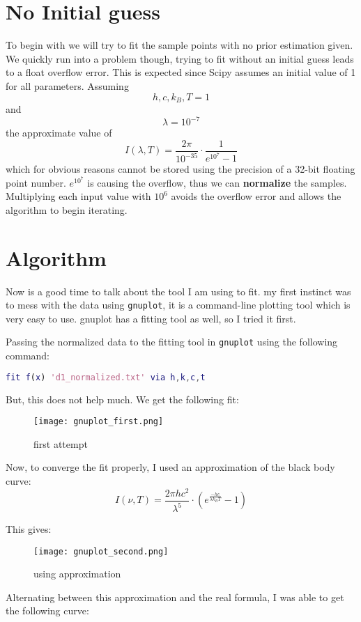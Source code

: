 \documentclass{report}
\begin{document}
\section*{No Initial guess}
To begin with we will try to fit the sample points with no prior estimation given. We quickly run into a problem though, trying to fit without an initial guess leads to a float overflow error. This is expected since Scipy assumes an initial value of 1 for all parameters. Assuming 
\[h, c, k_B, T = 1\] 
and 
\[\lambda = 10^{-7}\] 
the approximate value of \[I(\lambda, T) = \frac{2 \pi}{10^{-35}} \cdot \frac{1}{e^{10^7} - 1}\]
which for obvious reasons cannot be stored using the precision of a 32-bit floating point number. $e^{10^7}$ is causing the overflow, thus we can \textbf{normalize} the samples. Multiplying each input value with $10^6$ avoids the overflow error and allows the algorithm to begin iterating.

\section*{Algorithm}
Now is a good time to talk about the tool I am using to fit. my first instinct was to mess with the data using \texttt{gnuplot}, it is a command-line plotting tool which is very easy to use. gnuplot has a fitting tool as well, so I tried it first. 

Passing the normalized data to the fitting tool in \texttt{gnuplot} using the following command: 

\begin{lstlisting}[language=matlab]
	fit f(x) 'd1_normalized.txt' via h,k,c,t
\end{lstlisting}	

But, this does not help much. We get the following fit:
\begin{figure}[!h]
	\centering
	\texttt{[image: gnuplot\_first.png]}
    \caption{first attempt}
\end{figure}

Now, to converge the fit properly, I used an approximation of the 
black body curve: \[I(\nu, T) = \frac{2 \pi h c^2}{\lambda^5} \cdot ({e^{\frac{-h c}{\lambda k_B T}} - 1})\]

This gives: 
\begin{figure}[!h]
	\centering
	\texttt{[image: gnuplot\_second.png]}
    \caption{using approximation}
\end{figure}
\FloatBarrier
Alternating between this approximation and the real formula, I was able to get the following curve:
\end{document}
